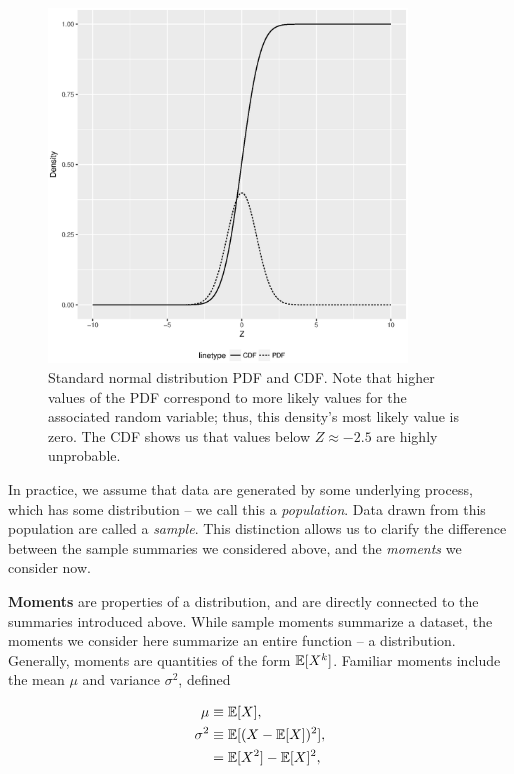 \documentclass[../primer.tex]{subfiles}
\begin{document}
\begin{figure}[!ht]
  \centering
  \includegraphics[width=0.85\textwidth]{./images/dist_normal}

  \caption{Standard normal distribution PDF and CDF. Note that higher values of
    the PDF correspond to more likely values for the associated random variable;
    thus, this density's most likely value is zero. The CDF shows us that values
    below $Z\approx-2.5$ are highly unprobable.}
  \label{fig:dist-norm}
\end{figure}

In practice, we assume that data are generated by some underlying process, which
has some distribution -- we call this a \emph{population}. Data drawn from this
population are called a \emph{sample}. This distinction allows us to clarify the
difference between the sample summaries we considered above, and the
\emph{moments} we consider now.

\noindent\textbf{Moments} are properties of a distribution, and are directly
connected to the summaries introduced above. While sample moments summarize a
dataset, the moments we consider here summarize an entire function -- a
distribution. Generally, moments are quantities of the form $\mathbb{E}[X^k]$. Familiar
moments include the mean $\mu$ and variance $\sigma^2$, defined

\begin{equation} \begin{aligned}
    \mu      &\equiv \mathbb{E}[X], \\
    \sigma^2 &\equiv \mathbb{E}[(X-\mathbb{E}[X])^2], \\
             &= \mathbb{E}[X^2] - \mathbb{E}[X]^2,
\end{aligned} \end{equation}
\end{document}
